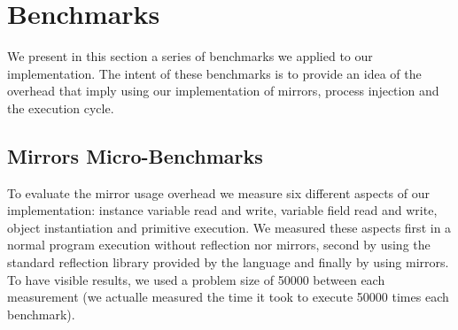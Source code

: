 %

\section{Benchmarks}

We present in this section a series of benchmarks we applied to our implementation. The intent of these benchmarks is to provide an idea of the overhead that imply using our implementation of mirrors, process injection and the execution cycle.

\subsection{Mirrors Micro-Benchmarks}

To evaluate the mirror usage overhead we measure six different aspects of our implementation: instance variable read and write, variable field read and write, object instantiation and primitive execution. We measured these aspects first in a normal program execution without reflection nor mirrors, second by using the standard reflection library provided by the language and finally by using mirrors. To have visible results, we used a problem size of 50000 between each measurement (\ie we actualle measured the time it took to execute 50000 times each benchmark).


